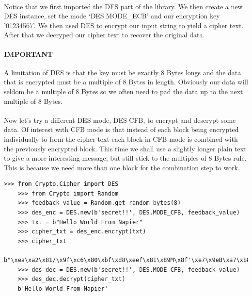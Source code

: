 \documentclass[12pt, a4paper, oneside]{book}
\begin{document}
{\paragraph{} Notice that we first imported the DES part of the library. We then create a new DES instance, set the mode `DES.MODE\_ECB' and our encryption key '01234567'. We then used DES to encrypt our input string to yield a cipher text. After that we decryped our cipher text to recover the original data.

\paragraph{IMPORTANT} A limitation of DES is that the key must be exactly 8 Bytes longs and the data that is encrypted must be a multiple of 8 Bytes in length. Obviously our data will seldom be a multiple of 8 Bytes so we often need to pad the data up to the next multiple of 8 Bytes.

\paragraph{} Now let's try a different DES mode, DES CFB, to encrypt and descrypt some data. Of interest with CFB mode is that instead of each block being encrypted individually to form the cipher text each block in CFB mode is combined with the previously encrypted block. This time we shall use a slightly longer plain text to give a more interesting message, but still stick to the multiples of 8 Bytes rule. This is because we need more than one block for the combination step to work. 

\begin{lstlisting}[style=DOS]
    >>> from Crypto.Cipher import DES
    >>> from Crypto import Random
    >>> feedback_value = Random.get_random_bytes(8)
    >>> des_enc = DES.new(b'secret!!', DES.MODE_CFB, feedback_value)
    >>> txt = b"Hello World From Napier"
    >>> cipher_txt = des_enc.encrypt(txt)
    >>> cipher_txt
    b"\xea\xa2\x81/\x9f\xc6\x80\xbf\xd8\xeef\x81\x89M\x8f'\xe7\x9eB\xa7\xb8\xd7\xd6"
    >>> des_dec = DES.new(b'secret!!', DES.MODE_CFB, feedback_value)
    >>> des_dec.decrypt(cipher_txt)
    b'Hello World From Napier'
\end{lstlisting}


}
\end{document}

